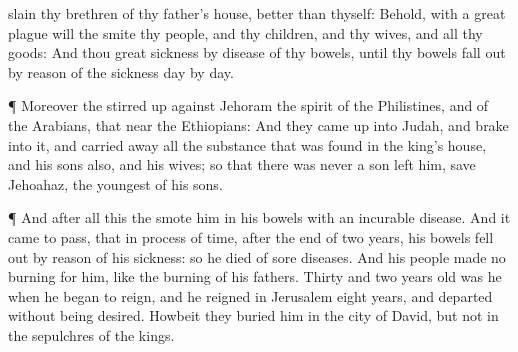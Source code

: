 {slain thy
brethren of thy
father’s
house,
{}
better than thyself:
Behold, with a
great
plague will the
{}
smite thy
people, and thy
children, and thy
wives, and all thy
goods:
And thou
{}
great
sickness by
disease of thy
bowels, until thy
bowels fall
out by reason of the
sickness
day by
day.
\par }{\PP {}¶ Moreover the
{} stirred
up against
Jehoram the
spirit of the
Philistines, and of the
Arabians, that
{}
near the
Ethiopians:
And they came
up into
Judah, and
brake into it, and carried
away all the
substance that was
found in the
king’s
house, and his
sons also, and his
wives; so that there was never a
son
left him, save
Jehoahaz, the
youngest of his
sons.
\par }{\PP {}¶ And
after all this the
{}
smote him in his
bowels with an
incurable
disease.
And it came to pass, that in process of
time,
after the
end of
two
years, his
bowels fell
out by
reason of his
sickness: so he
died of
sore
diseases. And his
people
made no
burning for him, like the
burning of his
fathers.
Thirty and
two years
old was he when he began to
reign, and he
reigned in
Jerusalem
eight
years, and
departed without being
desired. Howbeit they
buried him in the
city of
David, but not in the
sepulchres of the
kings.

}
